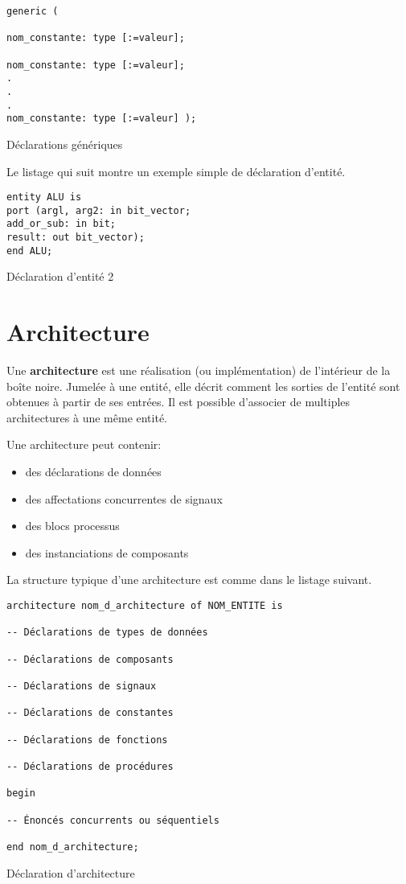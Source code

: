 \documentclass[letter, oneside]{book}
\begin{document}
\begin{listing}[htbp]
\begin{verbatim}
generic (

nom_constante: type [:=valeur];

nom_constante: type [:=valeur];
.
.
.
nom_constante: type [:=valeur] );
\end{verbatim}
\caption{Déclarations génériques}
\end{listing}


Le listage qui suit montre un exemple simple de déclaration d'entité. 

\begin{listing}[htbp]
\begin{verbatim}
entity ALU is
port (argl, arg2: in bit_vector;
add_or_sub: in bit;
result: out bit_vector);
end ALU;
\end{verbatim}
\caption{Déclaration d'entité 2}
\end{listing}

\section{Architecture}
\label{sec:org07ffa24}

Une \textbf{architecture} est une réalisation (ou implémentation) de
l'intérieur de la boîte noire. Jumelée à une entité, elle décrit
comment les sorties de l'entité sont obtenues à partir de ses
entrées. Il est possible d'associer de multiples architectures à une
même entité.

Une architecture peut contenir:

\begin{itemize}
\item des déclarations de données

\item des affectations concurrentes de signaux

\item des blocs processus

\item des instanciations de composants
\end{itemize}

La structure typique d'une architecture est comme dans le listage suivant.

\begin{listing}[htbp]
\begin{verbatim}
architecture nom_d_architecture of NOM_ENTITE is

-- Déclarations de types de données

-- Déclarations de composants

-- Déclarations de signaux

-- Déclarations de constantes

-- Déclarations de fonctions

-- Déclarations de procédures

begin

-- Énoncés concurrents ou séquentiels

end nom_d_architecture;
\end{verbatim}
\caption{Déclaration d'architecture}
\end{listing}
\end{document}
